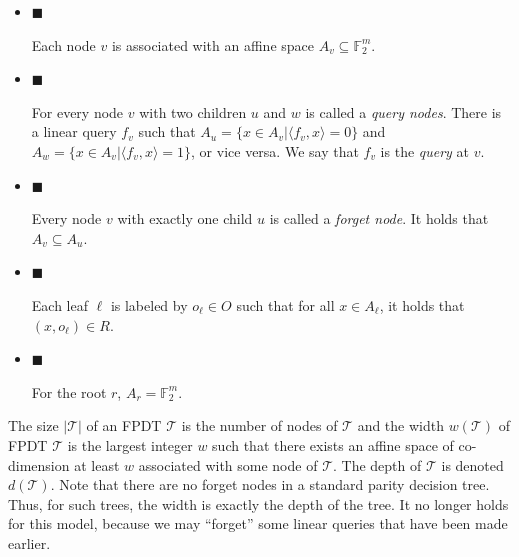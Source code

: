 \begin{itemize}


\item[] 
$\blacksquare$ 


Each node $v$ is associated with an affine space $A_{v}\subseteq\mathbb{F}_{2}^{m}$.\par





\item[] 
$\blacksquare$ 


For every node $v$ with two children $u$ and $w$ is called a \emph{query nodes}. There is a linear query $f_{v}$ such that $A_{u}=\{x\in A_{v}|\langle f_{v},x\rangle=0\}$ and $A_{w}=\{x\in A_{v}|\langle f_{v},x\rangle=1\}$, or vice versa.
We say that $f_{v}$ is the \emph{query} at $v$.\par





\item[] 
$\blacksquare$ 


Every node $v$ with exactly one child $u$ is called a \emph{forget node}. It holds that $A_{v}\subseteq A_{u}$.\par





\item[] 
$\blacksquare$ 


Each leaf $\ell$ is labeled by $o_{\ell}\in O$ such that for all $x\in A_{\ell}$, it holds that $(x,o_{\ell})\in R$.\par





\item[] 
$\blacksquare$ 


For the root $r$, $A_{r}=\mathbb{F}_{2}^{m}$.\par





\end{itemize}




The size $|\mathcal{T}|$ of an FPDT $\mathcal{T}$ is the number of nodes of $\mathcal{T}$ and the width $w(\mathcal{T})$ of FPDT $\mathcal{T}$ is the largest integer $w$ such that there exists an affine space of co-dimension at least $w$ associated with some node of $\mathcal{T}$.
The depth of $\mathcal{T}$ is denoted $d(\mathcal{T})$.
Note that there are no forget nodes in a standard parity decision tree.
Thus, for such trees, the width is exactly the depth of the tree.
It no longer holds for this model, because we may “forget” some linear queries that have been made earlier.\par




